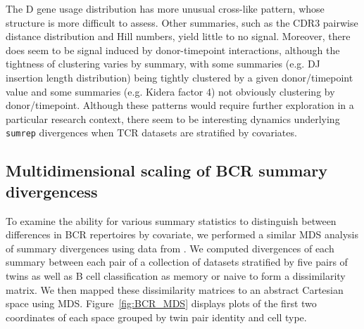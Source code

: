 \documentclass{article}
\begin{document}
The D gene usage distribution has more unusual cross-like pattern, whose structure is more difficult to assess.
Other summaries, such as the CDR3 pairwise distance distribution and Hill numbers, yield little to no signal.
Moreover, there does seem to be signal induced by donor-timepoint interactions, although the tightness of clustering varies by summary, with some summaries (e.g. DJ insertion length distribution) being tightly clustered by a given donor/timepoint value and some summaries (e.g. Kidera factor 4) not obviously clustering by donor/timepoint.
Although these patterns would require further exploration in a particular research context, there seem to be interesting dynamics underlying \texttt{sumrep} divergences when TCR datasets are stratified by covariates.

\subsection*{Multidimensional scaling of BCR summary divergencess}
To examine the ability for various summary statistics to distinguish between differences in BCR repertoires by covariate, we performed a similar MDS analysis of summary divergences using data from \cite{Rubelt2016-tl}.
We computed divergences of each summary between each pair of a collection of datasets stratified by five pairs of twins as well as B cell classification as memory or naive to form a dissimilarity matrix.
We then mapped these dissimilarity matrices to an abstract Cartesian space using MDS.
Figure~\ref{fig:BCR_MDS} displays plots of the first two coordinates of each space grouped by twin pair identity and cell type.
\end{document}
